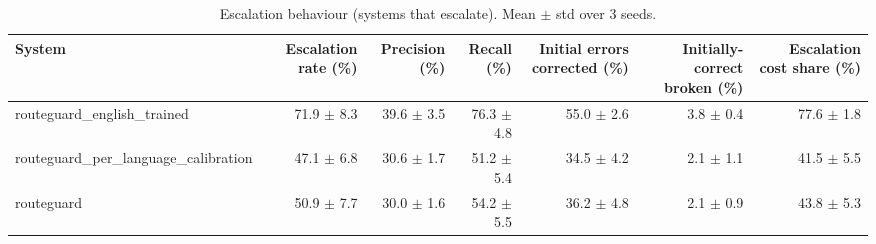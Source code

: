 \begin{table}[t]
\centering
\small
\caption{Escalation behaviour (systems that escalate). Mean $\pm$ std over 3 seeds.}
\label{tab:escalation}
\begin{tabular}{lrrrrrr}
\toprule
System & Escalation rate (\%) & Precision (\%) & Recall (\%) & Initial errors corrected (\%) & Initially-correct broken (\%) & Escalation cost share (\%) \\
\midrule
routeguard\_english\_trained & 71.9 $\pm$ 8.3 & 39.6 $\pm$ 3.5 & 76.3 $\pm$ 4.8 & 55.0 $\pm$ 2.6 & 3.8 $\pm$ 0.4 & 77.6 $\pm$ 1.8 \\
routeguard\_per\_language\_calibration & 47.1 $\pm$ 6.8 & 30.6 $\pm$ 1.7 & 51.2 $\pm$ 5.4 & 34.5 $\pm$ 4.2 & 2.1 $\pm$ 1.1 & 41.5 $\pm$ 5.5 \\
routeguard & 50.9 $\pm$ 7.7 & 30.0 $\pm$ 1.6 & 54.2 $\pm$ 5.5 & 36.2 $\pm$ 4.8 & 2.1 $\pm$ 0.9 & 43.8 $\pm$ 5.3 \\
\bottomrule
\end{tabular}
\end{table}
